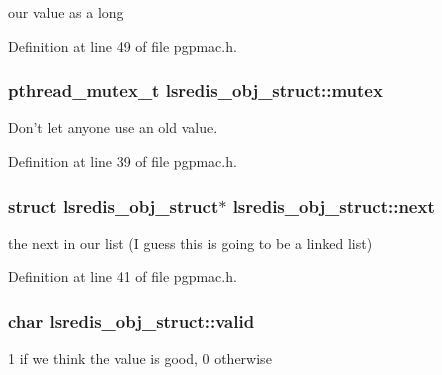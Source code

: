 our value as a long 



Definition at line 49 of file pgpmac.\-h.

\hypertarget{structlsredis__obj__struct_a0da18e7d0f7d52459bbc6fbc696d5252}{
\subsubsection[{mutex}]{\setlength{\rightskip}{0pt plus 5cm}pthread\-\_\-mutex\-\_\-t lsredis\-\_\-obj\-\_\-struct\-::mutex}}\label{structlsredis__obj__struct_a0da18e7d0f7d52459bbc6fbc696d5252}


Don't let anyone use an old value. 



Definition at line 39 of file pgpmac.\-h.

\hypertarget{structlsredis__obj__struct_afb7259e8c3c1c83ccc234b2b2894f2b0}{
\subsubsection[{next}]{\setlength{\rightskip}{0pt plus 5cm}struct {\bf lsredis\-\_\-obj\-\_\-struct}$\ast$ lsredis\-\_\-obj\-\_\-struct\-::next}}\label{structlsredis__obj__struct_afb7259e8c3c1c83ccc234b2b2894f2b0}


the next in our list (I guess this is going to be a linked list) 



Definition at line 41 of file pgpmac.\-h.

\hypertarget{structlsredis__obj__struct_a338ffa4123bd06b39c8b58f5e695575e}{
\subsubsection[{valid}]{\setlength{\rightskip}{0pt plus 5cm}char lsredis\-\_\-obj\-\_\-struct\-::valid}}\label{structlsredis__obj__struct_a338ffa4123bd06b39c8b58f5e695575e}


1 if we think the value is good, 0 otherwise 



